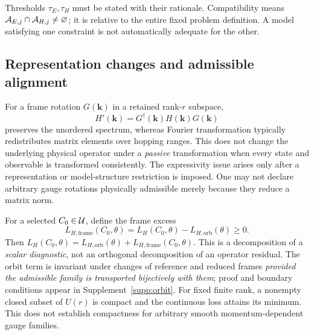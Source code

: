 \documentclass[11pt]{article}
\begin{document}
Thresholds $\tau_E,\tau_H$ must be stated with their rationale. Compatibility means $\mathcal A_{E,j}\cap\mathcal A_{H,j}\ne\varnothing$; it is relative to the entire fixed problem definition. A model satisfying one constraint is not automatically adequate for the other.

\subsection{Representation changes and admissible alignment}
For a frame rotation $G(\bm k)$ in a retained rank-$r$ subspace,
\begin{equation}\label{eq:gauge}
H'(\bm k)=G^\dagger(\bm k)H(\bm k)G(\bm k)
\end{equation}
preserves the unordered spectrum, whereas Fourier transformation typically redistributes matrix elements over hopping ranges. This does not change the underlying physical operator under a \emph{passive} transformation when every state and observable is transformed consistently. The expressivity issue arises only after a representation or model-structure restriction is imposed. One may not declare arbitrary gauge rotations physically admissible merely because they reduce a matrix norm.

For a selected $C_0\in\mathcal U$, define the frame excess
\begin{equation}\label{eq:orbit}
L_{H,\mathrm{frame}}(C_0,\theta)=L_H(C_0,\theta)-L_{H,\mathrm{orb}}(\theta)\ge0.
\end{equation}
Then $L_H(C_0,\theta)=L_{H,\mathrm{orb}}(\theta)+L_{H,\mathrm{frame}}(C_0,\theta)$. This is a decomposition of a \emph{scalar diagnostic}, not an orthogonal decomposition of an operator residual. The orbit term is invariant under changes of reference and reduced frames \emph{provided the admissible family is transported bijectively with them}; proof and boundary conditions appear in Supplement~\ref{supp:orbit}. For fixed finite rank, a nonempty closed subset of $U(r)$ is compact and the continuous loss attains its minimum. This does not establish compactness for arbitrary smooth momentum-dependent gauge families.
\end{document}
